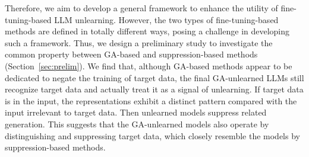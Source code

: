 




Therefore, we aim to develop a general framework to enhance the utility of fine-tuning-based LLM unlearning. However, the two types of fine-tuning-based methods are defined in totally different ways, posing a challenge in developing such a framework. Thus, 
we design a preliminary study to investigate the common property between GA-based and suppression-based methods ({Section~\ref{sec:prelim}}). We find that, although GA-based methods appear to be dedicated to negate the training of target data, the final GA-unlearned LLMs still recognize target data and actually treat it as a signal of unlearning. If target data is in the input, the representations exhibit a distinct pattern compared with the input irrelevant to target data. Then unlearned models suppress related generation. This suggests that
the GA-unlearned models also operate by distinguishing and suppressing target data, which closely resemble the models by suppression-based methods. 


